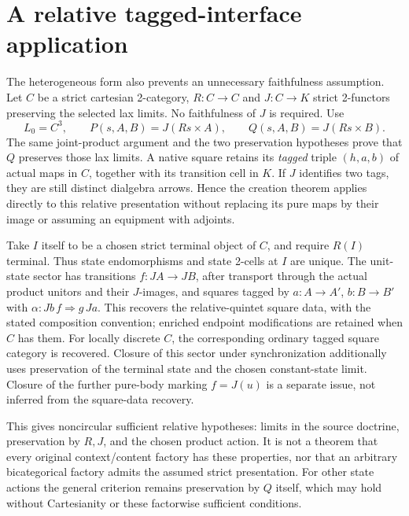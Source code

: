 \documentclass{article}
\begin{document}
\section{A relative tagged-interface application}
The heterogeneous form also prevents an unnecessary faithfulness assumption. Let $C$ be a strict cartesian 2-category, $R:C\to C$ and $J:C\to K$ strict 2-functors preserving the selected lax limits. No faithfulness of $J$ is required. Use
\[
L_0=C^3,\qquad P(s,A,B)=J(Rs\times A),\qquad Q(s,A,B)=J(Rs\times B).
\]
The same joint-product argument and the two preservation hypotheses prove that $Q$ preserves those lax limits. A native square retains its \emph{tagged} triple $(h,a,b)$ of actual maps in $C$, together with its transition cell in $K$. If $J$ identifies two tags, they are still distinct dialgebra arrows. Hence the creation theorem applies directly to this relative presentation without replacing its pure maps by their image or assuming an equipment with adjoints.

Take $I$ itself to be a chosen strict terminal object of $C$, and require $R(I)$ terminal. Thus state endomorphisms and state 2-cells at $I$ are unique. The unit-state sector has transitions $f:JA\to JB$, after transport through the actual product unitors and their $J$-images, and squares tagged by $a:A\to A'$, $b:B\to B'$ with $\alpha:Jb\,f\Rightarrow g\,Ja$. This recovers the relative-quintet square data, with the stated composition convention; enriched endpoint modifications are retained when $C$ has them. For locally discrete $C$, the corresponding ordinary tagged square category is recovered. Closure of this sector under synchronization additionally uses preservation of the terminal state and the chosen constant-state limit. Closure of the further pure-body marking $f=J(u)$ is a separate issue, not inferred from the square-data recovery.

This gives noncircular sufficient relative hypotheses: limits in the source doctrine, preservation by $R,J$, and the chosen product action. It is not a theorem that every original context/content factory has these properties, nor that an arbitrary bicategorical factory admits the assumed strict presentation. For other state actions the general criterion remains preservation by $Q$ itself, which may hold without Cartesianity or these factorwise sufficient conditions.
\end{document}
